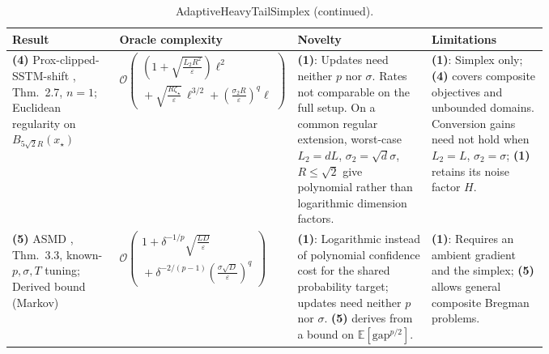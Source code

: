 \begin{table}[tp]
\centering
\caption{AdaptiveHeavyTailSimplex (continued).}
\begin{threeparttable}
\footnotesize
\setlength{\tabcolsep}{4pt}\renewcommand{\arraystretch}{1.25}
\begin{tabularx}{\linewidth}{@{}>{\raggedright\arraybackslash}p{0.20\linewidth}>{\raggedright\arraybackslash}p{0.32\linewidth}>{\raggedright\arraybackslash}p{0.25\linewidth}>{\raggedright\arraybackslash}X@{}}
\toprule
\textbf{Result} & \textbf{Oracle complexity} & \textbf{Novelty} & \textbf{Limitations} \\
\midrule
\textbf{(4)} Prox-clipped-SSTM-shift \citep{gorbunov2024heavyv2}, Thm.~2.7, $n=1$; Euclidean regularity on $B_{5\sqrt2 R}(x_\star)$
& $\displaystyle\mathcal{O}\!\left(\begin{gathered}\left(1+\sqrt{\frac{L_2R^2}{\varepsilon}}\right)\ell^2\\ {}+\sqrt{\frac{R\zeta_\star}{\varepsilon}}\,\ell^{3/2}+\left(\frac{\sigma_2R}{\varepsilon}\right)^q\ell\end{gathered}\right)$
& \textbf{(1)}: Updates need neither $p$ nor $\sigma$. Rates not comparable on the full setup. On a common regular extension, worst-case $L_2=dL$, $\sigma_2=\sqrt d\sigma$, $R\le\sqrt2$ give polynomial rather than logarithmic dimension factors.
& \textbf{(1)}: Simplex only; \textbf{(4)} covers composite objectives and unbounded domains. Conversion gains need not hold when $L_2=L$, $\sigma_2=\sigma$; \textbf{(1)} retains its noise factor $H$. \\
\midrule
\textbf{(5)} ASMD \citep{liu2026expectationv1}, Thm.~3.3, known-$p,\sigma,T$ tuning; Derived bound (Markov)
& $\displaystyle\mathcal{O}\!\left(\begin{gathered}1+\delta^{-1/p}\sqrt{\frac{LD}{\varepsilon}}\\ {}+\delta^{-2/(p-1)}\left(\frac{\sigma\sqrt D}{\varepsilon}\right)^q\end{gathered}\right)$
& \textbf{(1)}: Logarithmic instead of polynomial confidence cost for the shared probability target; updates need neither $p$ nor $\sigma$. \textbf{(5)} derives from a bound on $\mathbb E[\mathrm{gap}^{p/2}]$.
& \textbf{(1)}: Requires an ambient gradient and the simplex; \textbf{(5)} allows general composite Bregman problems. \\
\bottomrule
\end{tabularx}
\begin{tablenotes}[flushleft]\footnotesize

\end{tablenotes}
\end{threeparttable}
\end{table}

